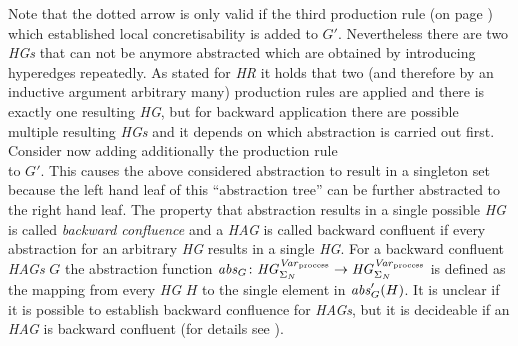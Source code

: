 	Note that the dotted arrow is only valid if the third production rule (on
	page \pageref{eq:listrule3}) which established local concretisability is
	added to $G'$. Nevertheless there are two \emph{\acp{HG}} that can not be
	anymore abstracted which are obtained by introducing hyperedges repeatedly.
	As stated for \emph{\ac{HR}} it holds that two (and therefore by an
	inductive argument arbitrary many) production rules are
	applied and there is exactly one resulting \emph{\ac{HG}}, but for backward
	application there are possible multiple resulting \emph{\acp{HG}} and it
	depends on which abstraction is carried out first. Consider now adding
	additionally the production rule
	\begin{equation*}
		\label{eq:listrule4}
		
	\end{equation*}
	to $G'$. This causes the above considered abstraction to result in a
	singleton set because the left hand leaf of this \enquote{abstraction tree}
	can be further abstracted to the right hand leaf. The property that
	abstraction results in a single possible \emph{\ac{HG}} is called
	\emph{backward confluence} and a \emph{\ac{HAG}} is called backward
	confluent if every abstraction for an arbitrary \emph{\ac{HG}} results in a
	single \emph{\ac{HG}}. For a backward confluent \emph{\acp{HAG}} $G$ the
	abstraction function $\mathit{abs}_{G}\colon \mathit{HG}_{\Sigma_{N}}^{\mathit{Var}_{\text{process}}}\rightarrow\mathit{HG}_{\Sigma_{N}}^{\mathit{Var}_{\text{process}}}$ is defined as the
	mapping from every \emph{\ac{HG}} $H$ to the single element in
	$\mathit{abs}_{G}'(H)$. It is unclear if it is possible to establish backward
	confluence for \emph{\acp{HAG}}, but it is decideable if an \emph{\ac{HAG}}
	is backward confluent (for details see \cite{InductivePredicates}).

